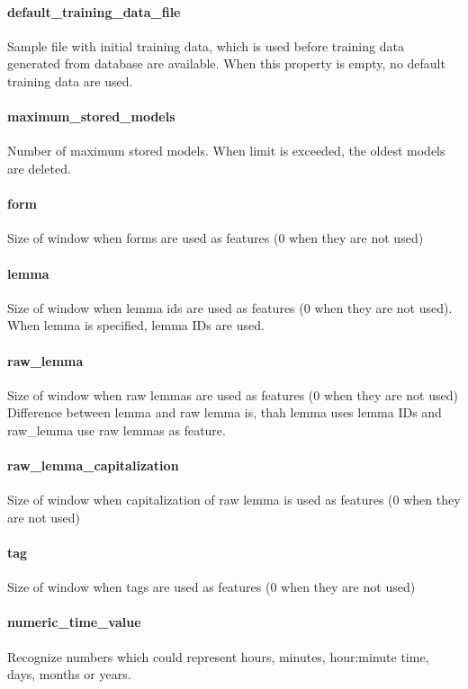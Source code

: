 
\paragraph{default\_training\_data\_file}
Sample file with initial training data, which is used before training data
generated from database are available. When this property is empty, no default training data
are used.

\paragraph{maximum\_stored\_models}
Number of maximum stored models. When limit is exceeded, the oldest models are deleted.

\paragraph{form}
Size of window when forms are used as features (0 when they are not used)

\paragraph{lemma}
Size of window when lemma ids are used as features (0 when they are not used).
When lemma is specified, lemma IDs are used.

\paragraph{raw\_lemma}
Size of window when raw lemmas are used as features (0 when they are not used)
Difference between lemma and raw lemma is, thah lemma uses lemma IDs and raw\_lemma use raw lemmas as feature.

\paragraph{raw\_lemma\_capitalization}
Size of window when capitalization of raw lemma is used as features (0 when they are not used)

\paragraph{tag}
Size of window when tags are used as features (0 when they are not used)

\paragraph{numeric\_time\_value}
Recognize numbers which could represent hours, minutes, hour:minute time, days,
months or years.

